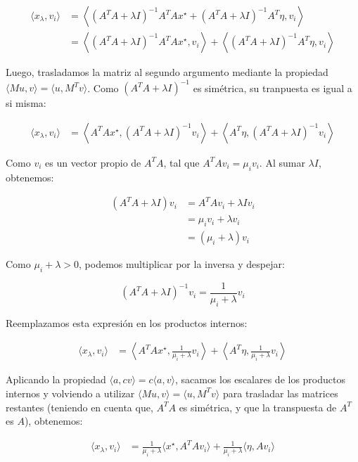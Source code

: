 \documentclass{article}
\begin{document}
\begin{enumerate}[label=\roman*., widest=iv]
  \[
  \begin{aligned}
  \langle x_\lambda,v_i\rangle
  &=\left\langle (A^TA+\lambda I)^{-1}A^TAx^\star+(A^TA+\lambda I)^{-1}A^T\eta,v_i\right\rangle\\
  &=\left\langle (A^TA+\lambda I)^{-1}A^TAx^\star,v_i\right\rangle+\left\langle (A^TA+\lambda I)^{-1}A^T\eta,v_i\right\rangle
  \end{aligned}
  \]

  Luego, trasladamos la matriz al segundo argumento mediante la propiedad \(\langle Mu, v \rangle = \langle u, M^T v \rangle\). Como \((A^T A + \lambda I)^{-1}\) es simétrica, su tranpuesta es igual a si misma:

  \[
  \begin{aligned}
  \langle x_\lambda,v_i\rangle
  &=\left\langle A^TAx^\star,(A^TA+\lambda I)^{-1}v_i\right\rangle+\left\langle A^T\eta,(A^TA+\lambda I)^{-1}v_i\right\rangle
  \end{aligned}
  \]

  Como \(v_i\) es un vector propio de \(A^TA\), tal que \(A^TAv_i=\mu_i v_i\). Al sumar \(\lambda I\), obtenemos:

  \[
  \begin{aligned}
  (A^TA+\lambda I)v_i
  &=A^TAv_i+\lambda Iv_i\\
  &=\mu_i v_i+\lambda v_i\\
  &=(\mu_i+\lambda)v_i
  \end{aligned}
  \]

  \bigskip

  Como \(\mu_i+\lambda>0\), podemos multiplicar por la inversa y despejar:

  \[
  (A^TA+\lambda I)^{-1}v_i=\frac{1}{\mu_i+\lambda}v_i
  \]

  Reemplazamos esta expresión en los productos internos:

  \[
  \begin{aligned}
  \langle x_\lambda,v_i\rangle
  &=\left\langle A^TAx^\star,\frac{1}{\mu_i+\lambda}v_i\right\rangle+\left\langle A^T\eta,\frac{1}{\mu_i+\lambda}v_i\right\rangle
  \end{aligned}
  \]

  Aplicando la propiedad \(\langle a,cv\rangle=c\langle a,v\rangle\), sacamos los escalares de los productos internos y volviendo a utilizar \(\langle Mu,v\rangle=\langle u,M^Tv\rangle\) para trasladar las matrices restantes (teniendo en cuenta que, \(A^TA\) es simétrica, y que la transpuesta de \(A^T\) es \(A\)), obtenemos:

  \[
  \begin{aligned}
  \langle x_\lambda,v_i\rangle
  &=\frac{1}{\mu_i+\lambda}\langle x^\star,A^TAv_i\rangle+\frac{1}{\mu_i+\lambda}\langle\eta,Av_i\rangle
  \end{aligned}
  \]


\end{enumerate}
\end{document}
